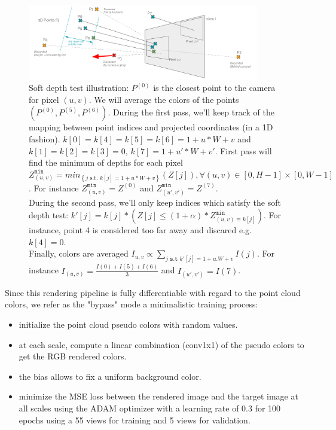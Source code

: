 \begin{figure}[h]
    \centering
    \includegraphics[width=0.9\textwidth]{figures/soft_depth_test_two_pixels.png}
    \caption{Soft depth test illustration: 
    $P^{(0)}$ is the closest point to the camera for pixel $(u,v)$. We will average the colors of the points $(P^{(0)}, P^{(5)}, P^{(6)})$. During the first pass, we'll keep track of the mapping between point indices and projected coordinates (in a 1D fashion). $k[0]=k[4]=k[5]=k[6]=1+u*W+v$ and $k[1]=k[2]=k[3]=0$, $k[7] = 1+u'*W+v'$. First pass will find the minimum of depths for each pixel $Z^{\texttt{min}}_{(u,v)} = min_{\left\{j  \text{ s.t. } k[j]=1+u*W+v\right\}} \left(Z[j]\right), \forall (u,v) \in \left[0, H-1\right] \times \left[0, W-1\right]$. For instance $Z^{\texttt{min}}_{(u,v)} = Z^{(0)}$ and $Z^{\texttt{min}}_{(u',v')} = Z^{(7)}$. \\ During the second pass, we'll only keep indices which satisfy the soft depth test: $ k'[j] = k[j] * \left(Z[j] \leq (1+\alpha) *Z^{\texttt{min}}_{(u,v) \equiv k[j]}\right)$.
   For instance, point 4 is considered too far away and discared e.g. $k[4]=0$. \\Finally, colors are averaged $I_{u, v} \propto \sum_{j \texttt{ s.t  } k'[j]=1+u.W+v}{I(j)}$. For instance $I_{(u, v)} = \frac{I(0) + I(5) + I(6)}{3}$ and $I_{(u', v')} = I(7)$.}
    \label{fig:soft_depth_test}
\end{figure}

Since this rendering pipeline is fully differentiable with regard to the point cloud colors, we refer as the "bypass" mode a minimalistic training process: 
\begin{itemize}
    \item initialize the point cloud pseudo colors with random values.
    \item at each scale, compute a linear combination (conv1x1) of the pseudo colors to get the RGB rendered colors.
    \item the bias allows to fix a uniform background color.
    \item minimize the MSE loss between the rendered image and the target image at all scales using the ADAM optimizer with a learning rate of $0.3$ for 100 epochs using a 55 views for training and 5 views for validation.
\end{itemize}


